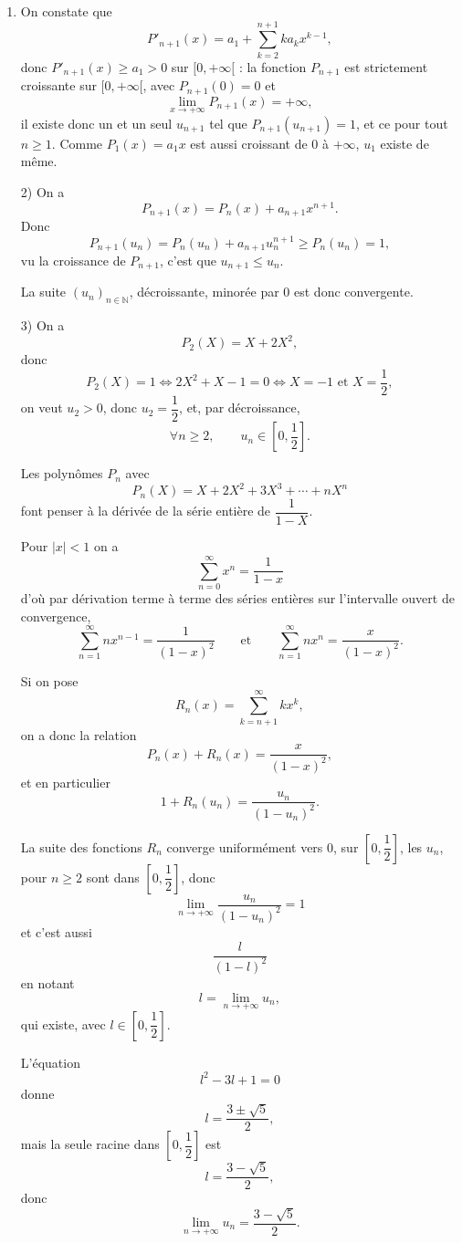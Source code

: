 \begin{enumerate}[label=\arabic*.,leftmargin=2.2em,itemsep=1.1em]
\item On constate que
\[
P'_{n+1}(x)=a_1+\sum_{k=2}^{n+1}ka_kx^{k-1},
\]
donc $P'_{n+1}(x)\ge a_1>0$ sur $[0,+\infty[$ : la fonction $P_{n+1}$ est strictement croissante sur $[0,+\infty[$, avec $P_{n+1}(0)=0$ et
\[
\lim_{x\to+\infty}P_{n+1}(x)=+\infty,
\]
il existe donc un et un seul $u_{n+1}$ tel que $P_{n+1}(u_{n+1})=1$, et ce pour tout $n\ge1$. Comme $P_1(x)=a_1x$ est aussi croissant de 0 à $+\infty$, $u_1$ existe de même.

2) On a
\[
P_{n+1}(x)=P_n(x)+a_{n+1}x^{n+1}.
\]
Donc
\[
P_{n+1}(u_n)=P_n(u_n)+a_{n+1}u_n^{n+1}\ge P_n(u_n)=1,
\]
vu la croissance de $P_{n+1}$, c'est que $u_{n+1}\le u_n$.

La suite $(u_n)_{n\in\mathbb N}$, décroissante, minorée par 0 est donc convergente.

3) On a
\[
P_2(X)=X+2X^2,
\]
donc
\[
P_2(X)=1\Longleftrightarrow 2X^2+X-1=0
\Longleftrightarrow X=-1\text{ et }X=\frac12,
\]
on veut $u_2>0$, donc $u_2=\dfrac12$, et, par décroissance,
\[
\forall n\ge2,\qquad u_n\in\left[0,\frac12\right].
\]

Les polynômes $P_n$ avec
\[
P_n(X)=X+2X^2+3X^3+\cdots+nX^n
\]
font penser à la dérivée de la série entière de $\dfrac1{1-X}$.

Pour $|x|<1$ on a
\[
\sum_{n=0}^{\infty}x^n=\frac1{1-x}
\]
d'où par dérivation terme à terme des séries entières sur l'intervalle ouvert de convergence,
\[
\sum_{n=1}^{\infty}nx^{n-1}=\frac1{(1-x)^2}
\qquad\text{et}\qquad
\sum_{n=1}^{\infty}nx^n=\frac{x}{(1-x)^2}.
\]

Si on pose
\[
R_n(x)=\sum_{k=n+1}^{\infty}kx^k,
\]
on a donc la relation
\[
P_n(x)+R_n(x)=\frac{x}{(1-x)^2},
\]
et en particulier
\[
1+R_n(u_n)=\frac{u_n}{(1-u_n)^2}.
\]

La suite des fonctions $R_n$ converge uniformément vers 0, sur $\left[0,\dfrac12\right]$, les $u_n$, pour $n\ge2$ sont dans $\left[0,\dfrac12\right]$, donc
\[
\lim_{n\to+\infty}\frac{u_n}{(1-u_n)^2}=1
\]
et c'est aussi
\[
\frac{l}{(1-l)^2}
\]
en notant
\[
l=\lim_{n\to+\infty}u_n,
\]
qui existe, avec $l\in\left[0,\dfrac12\right]$.

L'équation
\[
l^2-3l+1=0
\]
donne
\[
l=\frac{3\pm\sqrt5}{2},
\]
mais la seule racine dans $\left[0,\dfrac12\right]$ est
\[
l=\frac{3-\sqrt5}{2},
\]
donc
\[
\lim_{n\to+\infty}u_n=\frac{3-\sqrt5}{2}.
\]

\end{enumerate}
